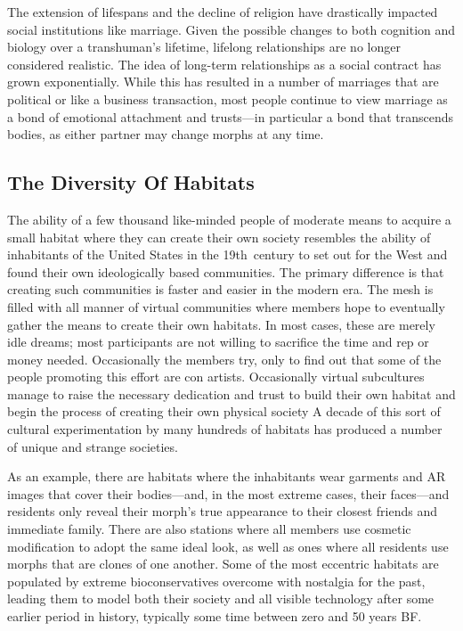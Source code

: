 The extension of lifespans and the decline of religion
have drastically impacted social institutions like
marriage. Given the possible changes to both cognition
and biology over a transhuman's lifetime, lifelong
relationships are no longer considered realistic. The 
idea of long-term relationships as a social contract 
has grown exponentially. While this has resulted in 
a number of marriages that are political or like a 
business transaction, most people continue to view 
marriage as a bond of emotional attachment and 
trusts—in particular a bond that transcends bodies, 
as either partner may change morphs at any time. 

\subsection{The Diversity Of Habitats}

The ability of a few thousand like-minded people of 
moderate means to acquire a small habitat where 
they can create their own society resembles the 
ability of inhabitants of the United States in the 
19th century to set out for the West and found their 
own ideologically based communities. The primary 
difference is that creating such communities is faster 
and easier in the modern era. The mesh is filled with 
all manner of virtual communities where members 
hope to eventually gather the means to create their 
own habitats. In most cases, these are merely idle 
dreams; most participants are not willing to sacrifice 
the time and rep or money needed. Occasionally the 
members try, only to find out that some of the people 
promoting this effort are con artists. Occasionally 
virtual subcultures manage to raise the necessary 
dedication and trust to build their own habitat and 
begin the process of creating their own physical society
A decade of this sort of cultural experimentation
by many hundreds of habitats has produced a
number of unique and strange societies.

As an example, there are habitats where the inhabitants
wear garments and AR images that cover
their bodies—and, in the most extreme cases, their 
faces—and residents only reveal their morph's true 
appearance to their closest friends and immediate 
family. There are also stations where all members use 
cosmetic modification to adopt the same ideal look, 
as well as ones where all residents use morphs that 
are clones of one another. Some of the most eccentric 
habitats are populated by extreme bioconservatives 
overcome with nostalgia for the past, leading them 
to model both their society and all visible technology 
after some earlier period in history, typically some 
time between zero and 50 years BF.

